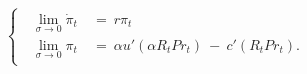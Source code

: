 \begin{equation}
\begin{cases}
        \begin{split}
        \ \lim_{\sigma \to 0} \dot{\pi}_{t} \
        & = \ r\pi_{t} \\
        \ \lim_{\sigma \to 0} \pi_{t} \
        & = \ \alpha u'(\alpha R_{t} Pr_{t}) \ - \ c'(R_{t} Pr_{t}).
        \end{split}
    \end{cases}
\label{Equation:Social-Planners-Problem_Reverting-to-the-Hotelling-Model}
\end{equation}